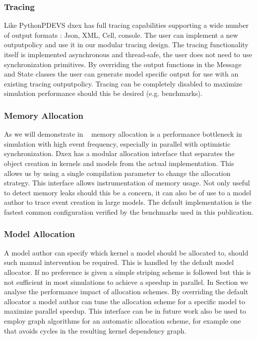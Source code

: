 \subsubsection{Tracing}
Like PythonPDEVS dxex has full tracing capabilities supporting a wide number of output formats : Json, XML, Cell, console. The user can implement a new outputpolicy and use it in our modular tracing design. The tracing functionality itself is implemented asynchronous and thread-safe, the user does not need to use synchronization primitives. By overriding the output functions in the Message and State classes the user can generate model specific output for use with an existing tracing outputpolicy. Tracing can be completely disabled to maximize simulation performance should this be desired (e.g. benchmarks). 
\subsubsection{Memory Allocation}
As we will demonstrate in ~ memory allocation is a performance bottleneck in simulation with high event frequency, especially in parallel with optimistic synchronization. Dxex has a modular allocation interface that separates the object creation in kernels and models from the actual implementation. This allows us by using a single compilation parameter to change the allocation strategy. This interface allows instrumentation of memory usage. Not only useful to detect memory leaks should this be a concern, it can also be of use to a model author to trace event creation in large models. The default implementation is the fastest common configuration verified by the benchmarks used in this publication.
\subsubsection{Model Allocation}
A model author can specify which kernel a model should be allocated to, should such manual intervention be required. This is handled by the default model allocator. If no preference is given a simple striping scheme is followed but this is not sufficient in most simulations to achieve a speedup in parallel. In Section  we analyse the performance impact of allocation schemes. By overriding the default allocator a model author can tune the allocation scheme for a specific model to maximize parallel speedup. This interface can be in future work also be used to employ graph algorithms for an automatic allocation scheme, for example one that avoids cycles in the resulting kernel dependency graph.
